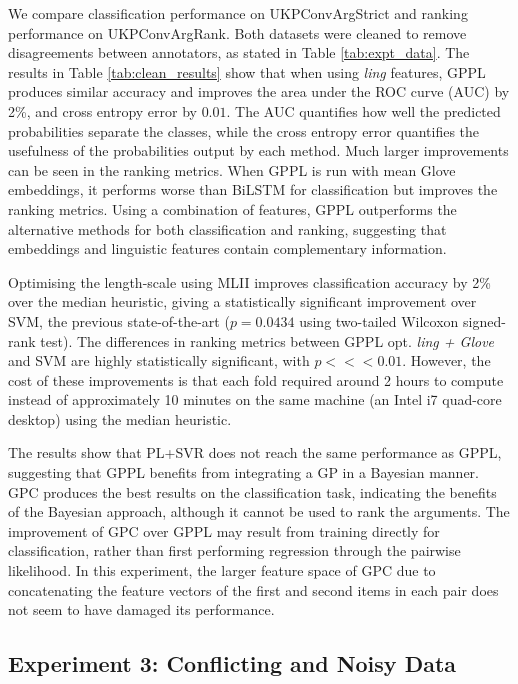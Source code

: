 % 
We compare classification performance on UKPConvArgStrict  
and ranking performance on UKPConvArgRank. 
Both datasets were cleaned to remove disagreements between annotators, as stated in Table \ref{tab:expt_data}.
The results in Table \ref{tab:clean_results} show that when using \emph{ling} features,
GPPL produces similar accuracy and improves the area under the ROC curve (AUC) by 2\%,
and cross entropy error by $0.01$.
The AUC quantifies how well the predicted probabilities separate the classes,
while the cross entropy error quantifies the usefulness of the probabilities output by each method.
Much larger improvements can be seen in the ranking metrics. 
When GPPL is run with mean Glove embeddings, it performs worse than
BiLSTM for classification but improves the ranking metrics. Using a combination of features,
GPPL outperforms the alternative methods for both classification and ranking, 
suggesting that embeddings and linguistic features contain complementary information.

Optimising the length-scale using MLII improves classification accuracy by 2\% over the median heuristic,
giving a statistically significant improvement over SVM, the previous state-of-the-art ($p=0.0434$ using
two-tailed Wilcoxon signed-rank test).
The differences in ranking metrics between GPPL opt. \emph{ling + Glove}
and SVM are highly statistically significant, with $p <<<0.01$.
However, the cost of these improvements is that each fold required around 2 hours to compute instead of 
approximately 10 minutes on the same machine (an Intel i7 quad-core desktop) using the median heuristic. 

The results show that PL+SVR does not reach the same performance as GPPL, 
suggesting that GPPL benefits from  integrating a GP in a Bayesian manner. 
GPC produces the best results on the classification task, 
indicating the benefits of the Bayesian approach, although it cannot be used to rank the arguments.
The improvement of GPC over GPPL may result from training directly for classification, 
rather than first performing regression through the pairwise likelihood. 
In this experiment, the larger feature space of GPC 
due to concatenating the feature vectors of the first and second items in each pair  
does not seem to have damaged its performance.

\subsection{Experiment 3: Conflicting and Noisy Data}

